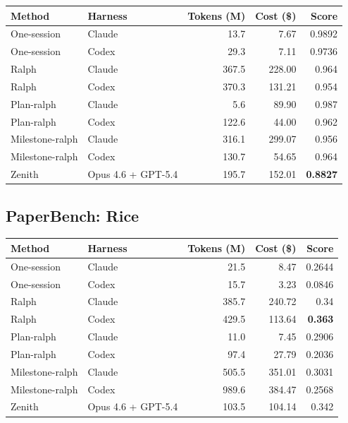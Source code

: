 \documentclass[11pt,a4paper]{article}
\newcommand{\code}[1]{#1}
\begin{document}
\noindent\begin{tabular}{@{}llrrr@{}}
\toprule
\rowcolor{tablehead}\textbf{\color{white}Method} & \textbf{\color{white}Harness} & \textbf{\color{white}Tokens (M)} & \textbf{\color{white}Cost (\$)} & \textbf{\color{white}Score} \\
\midrule
\code{One-session}    & Claude              & 13.7  & 7.67    & 0.9892 \\
\rowcolor{tableband}
\code{One-session}    & Codex               & 29.3  & 7.11    & 0.9736 \\
\code{Ralph}          & Claude              & 367.5 & 228.00  & 0.964 \\
\rowcolor{tableband}
\code{Ralph}          & Codex               & 370.3 & 131.21  & 0.954 \\
\code{Plan-ralph}     & Claude              & 5.6   & 89.90   & 0.987 \\
\rowcolor{tableband}
\code{Plan-ralph}     & Codex               & 122.6 & 44.00   & 0.962 \\
\code{Milestone-ralph}& Claude              & 316.1 & 299.07  & 0.956 \\
\rowcolor{tableband}
\code{Milestone-ralph}& Codex               & 130.7 & 54.65   & 0.964 \\
\code{Zenith}         & Opus 4.6 + GPT-5.4  & 195.7 & 152.01  & \textbf{0.8827} \\
\bottomrule
\end{tabular}

\subsection*{PaperBench: Rice}

\noindent\begin{tabular}{@{}llrrr@{}}
\toprule
\rowcolor{tablehead}\textbf{\color{white}Method} & \textbf{\color{white}Harness} & \textbf{\color{white}Tokens (M)} & \textbf{\color{white}Cost (\$)} & \textbf{\color{white}Score} \\
\midrule
\code{One-session}    & Claude              & 21.5  & 8.47    & 0.2644 \\
\rowcolor{tableband}
\code{One-session}    & Codex               & 15.7  & 3.23    & 0.0846 \\
\code{Ralph}          & Claude              & 385.7 & 240.72  & 0.34 \\
\rowcolor{tableband}
\code{Ralph}          & Codex               & 429.5 & 113.64  & \textbf{0.363} \\
\code{Plan-ralph}     & Claude              & 11.0  & 7.45    & 0.2906 \\
\rowcolor{tableband}
\code{Plan-ralph}     & Codex               & 97.4  & 27.79   & 0.2036 \\
\code{Milestone-ralph}& Claude              & 505.5 & 351.01  & 0.3031 \\
\rowcolor{tableband}
\code{Milestone-ralph}& Codex               & 989.6 & 384.47  & 0.2568 \\
\code{Zenith}         & Opus 4.6 + GPT-5.4  & 103.5 & 104.14  & 0.342 \\
\bottomrule
\end{tabular}
\end{document}
